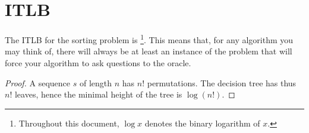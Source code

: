 \section{ITLB}
\label{tree:sorting:ITLB}

\begin{theorem}
The ITLB for the sorting problem is \footnote{Throughout this document, $\log x$ denotes the binary logarithm of $x$.}. This means that, for any algorithm you may think of, there will always be at least an instance of the problem that will force your algorithm to ask  questions to the oracle.
\end{theorem}

\begin{proof}
A sequence $s$ of length $n$ has $n!$ permutations. The decision tree has thus $n!$ leaves, hence the minimal height of the tree is $\log(n!)$.
\end{proof}

